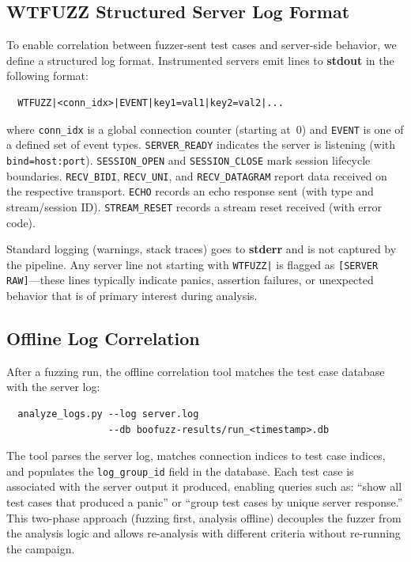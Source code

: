 \subsection{WTFUZZ Structured Server Log Format}

To enable correlation between fuzzer-sent test cases and server-side behavior, we define a structured log format. Instrumented servers emit lines to \textbf{stdout} in the following format:

\begin{verbatim}
  WTFUZZ|<conn_idx>|EVENT|key1=val1|key2=val2|...
\end{verbatim}

\noindent where \texttt{conn\_idx} is a global connection counter (starting at~0) and \texttt{EVENT} is one of a defined set of event types. \texttt{SERVER\_READY} indicates the server is listening (with \texttt{bind=host:port}). \texttt{SESSION\_OPEN} and \texttt{SESSION\_CLOSE} mark session lifecycle boundaries. \texttt{RECV\_BIDI}, \texttt{RECV\_UNI}, and \texttt{RECV\_DATAGRAM} report data received on the respective transport. \texttt{ECHO} records an echo response sent (with type and stream/session ID). \texttt{STREAM\_RESET} records a stream reset received (with error code).

Standard logging (warnings, stack traces) goes to \textbf{stderr} and is not captured by the pipeline. Any server line not starting with \texttt{WTFUZZ|} is flagged as \texttt{[SERVER RAW]}---these lines typically indicate panics, assertion failures, or unexpected behavior that is of primary interest during analysis.

\subsection{Offline Log Correlation}

After a fuzzing run, the offline correlation tool matches the test case database with the server log:

\begin{verbatim}
  analyze_logs.py --log server.log
                  --db boofuzz-results/run_<timestamp>.db
\end{verbatim}

The tool parses the server log, matches connection indices to test case indices, and populates the \texttt{log\_group\_id} field in the database. Each test case is associated with the server output it produced, enabling queries such as: ``show all test cases that produced a panic'' or ``group test cases by unique server response.'' This two-phase approach (fuzzing first, analysis offline) decouples the fuzzer from the analysis logic and allows re-analysis with different criteria without re-running the campaign.

